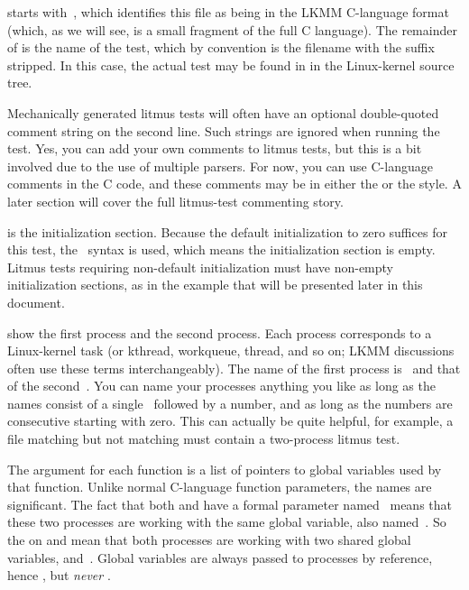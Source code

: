 \begin{fcvref}
 starts with~, which identifies this file as being in the
LKMM C-language format (which, as we will see, is a small fragment
of the full C language).
The remainder of  is the name of the test, which by convention
is the filename with the  suffix stripped.
In this case, the actual test may be found in
in the Linux-kernel source tree.

Mechanically generated litmus tests will often have an optional
double-quoted comment string on the second line.
Such strings are ignored when running the test.
Yes, you can add your own comments to litmus tests, but this is a bit
involved due to the use of multiple parsers.
For now, you can use C-language comments in the C code, and these comments
may be in either the \qco{/* */} or the \qco{//} style.
A later section will cover the full litmus-test commenting story.

 is the initialization section.
Because the default initialization to zero suffices for this test,
the~\qco{\{\}} syntax is used, which means the initialization section is empty.
Litmus tests requiring non-default initialization must have non-empty
initialization sections, as in the example that will be presented later
in this document.

 show the first process and
 the second process.
Each process corresponds to a Linux-kernel task (or kthread, workqueue, thread,
and so on; LKMM discussions often use these terms interchangeably).
The name of the first process is~ and that of the second~.
You can name your processes anything you like as long as the names consist
of a single~ followed by a number, and as long as the numbers are
consecutive starting with zero.
This can actually be quite helpful, for example, a  file
matching  but not matching  must contain a two-process
litmus test.

The argument for each function is a list of pointers to global variables
used by that function.
Unlike normal C-language function parameters, the names are significant.
The fact that both  and  have a formal parameter
named~ means that these two processes are working with the
same global variable, also named~.
So the  on  and  mean that both
processes are working with two shared global variables,  and~.
Global variables are always passed to processes by reference, hence
, but \emph{never} .


\end{fcvref}
